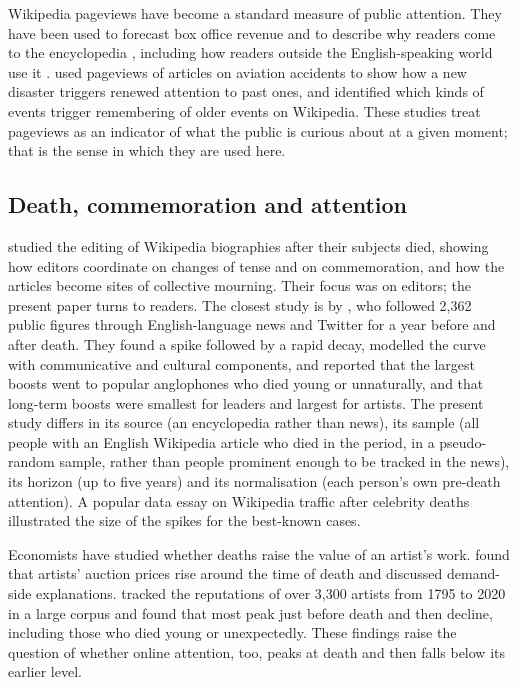 \documentclass[11pt,a4paper]{article}
\begin{document}
Wikipedia pageviews have become a standard measure of public attention. They have been used to forecast box office revenue \citep{mestyan2013} and to describe why readers come to the encyclopedia \citep{singer2017}, including how readers outside the English-speaking world use it \citep{lemmerich2019}. \citet{garciagavilanes2017} used pageviews of articles on aviation accidents to show how a new disaster triggers renewed attention to past ones, and \citet{kanhabua2014} identified which kinds of events trigger remembering of older events on Wikipedia. These studies treat pageviews as an indicator of what the public is curious about at a given moment; that is the sense in which they are used here.

\subsection{Death, commemoration and attention}
\citet{keegan2015} studied the editing of Wikipedia biographies after their subjects died, showing how editors coordinate on changes of tense and on commemoration, and how the articles become sites of collective mourning. Their focus was on editors; the present paper turns to readers. The closest study is by \citet{west2021}, who followed 2,362 public figures through English-language news and Twitter for a year before and after death. They found a spike followed by a rapid decay, modelled the curve with communicative and cultural components, and reported that the largest boosts went to popular anglophones who died young or unnaturally, and that long-term boosts were smallest for leaders and largest for artists. The present study differs in its source (an encyclopedia rather than news), its sample (all people with an English Wikipedia article who died in the period, in a pseudo-random sample, rather than people prominent enough to be tracked in the news), its horizon (up to five years) and its normalisation (each person's own pre-death attention). A popular data essay on Wikipedia traffic after celebrity deaths \citep{samora2018} illustrated the size of the spikes for the best-known cases.

Economists have studied whether deaths raise the value of an artist's work. \citet{ekelund2000} found that artists' auction prices rise around the time of death and discussed demand-side explanations. \citet{zhang2023} tracked the reputations of over 3,300 artists from 1795 to 2020 in a large corpus and found that most peak just before death and then decline, including those who died young or unexpectedly. These findings raise the question of whether online attention, too, peaks at death and then falls below its earlier level.
\end{document}
